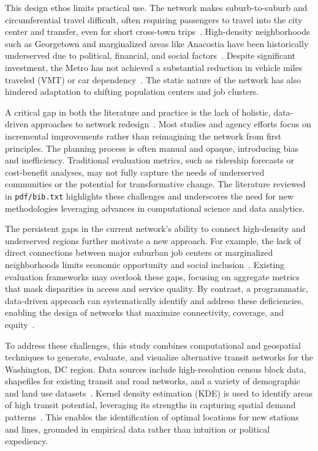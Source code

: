 \documentclass[manuscript]{acmart}
\begin{document}
This design ethos limits practical use. The network makes suburb-to-suburb and circumferential travel difficult, often requiring passengers to travel into the city center and transfer, even for short cross-town trips~\cite{bib:bast2016route}. High-density neighborhoods such as Georgetown and marginalized areas like Anacostia have been historically underserved due to political, financial, and social factors~\cite{bib:overview-field}. Despite significant investment, the Metro has not achieved a substantial reduction in vehicle miles traveled (VMT) or car dependency~\cite{bib:wmata-vmt}. The static nature of the network has also hindered adaptation to shifting population centers and job clusters.

A critical gap in both the literature and practice is the lack of holistic, data-driven approaches to network redesign~\cite{bib:camporeale2017equity}. Most studies and agency efforts focus on incremental improvements rather than reimagining the network from first principles. The planning process is often manual and opaque, introducing bias and inefficiency. Traditional evaluation metrics, such as ridership forecasts or cost-benefit analyses, may not fully capture the needs of underserved communities or the potential for transformative change. The literature reviewed in \texttt{pdf/bib.txt} highlights these challenges and underscores the need for new methodologies leveraging advances in computational science and data analytics.

The persistent gaps in the current network's ability to connect high-density and underserved regions further motivate a new approach. For example, the lack of direct connections between major suburban job centers or marginalized neighborhoods limits economic opportunity and social inclusion~\cite{bib:overview-field}. Existing evaluation frameworks may overlook these gaps, focusing on aggregate metrics that mask disparities in access and service quality. By contrast, a programmatic, data-driven approach can systematically identify and address these deficiencies, enabling the design of networks that maximize connectivity, coverage, and equity~\cite{bib:bast2016route, bib:camporeale2017equity}.

To address these challenges, this study combines computational and geospatial techniques to generate, evaluate, and visualize alternative transit networks for the Washington, DC region. Data sources include high-resolution census block data, shapefiles for existing transit and road networks, and a variety of demographic and land use datasets~\cite{lit:opendata, lit:census}. Kernel density estimation (KDE) is used to identify areas of high transit potential, leveraging its strengths in capturing spatial demand patterns~\cite{bib:silverman1986density}. This enables the identification of optimal locations for new stations and lines, grounded in empirical data rather than intuition or political expediency.
\end{document}
